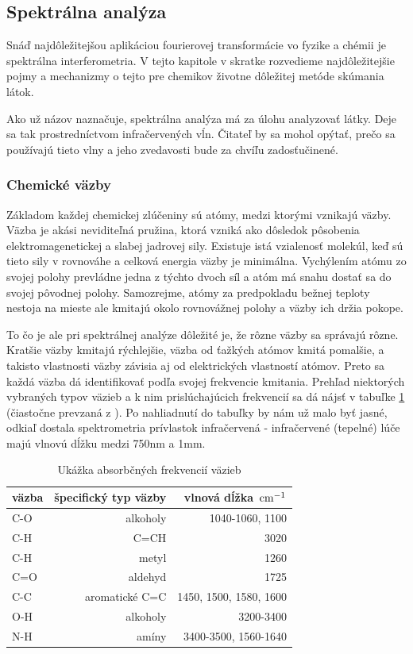 \subsection{Spektrálna analýza}

Snáď najdôležitejšou aplikáciou fourierovej transformácie vo fyzike a
chémii je spektrálna interferometria. V tejto kapitole v skratke
rozvedieme najdôležitejšie pojmy a mechanizmy o tejto pre chemikov
životne dôležitej metóde skúmania látok.


Ako už názov naznačuje, spektrálna analýza má za úlohu analyzovať
látky. Deje sa tak prostredníctvom infračervených vĺn. Čitateľ by sa
mohol opýtať, prečo sa používajú tieto vlny a jeho zvedavosti bude za
chvíľu zadosťučinené.

\subsubsection{Chemické väzby}
Základom každej chemickej zlúčeniny sú atómy, medzi ktorými vznikajú
väzby. Väzba je akási neviditeľná pružina, ktorá vzniká ako dôsledok
pôsobenia elektromagenetickej a slabej jadrovej sily. Existuje istá
vzialenosť molekúl, keď sú tieto sily v rovnováhe a celková energia
väzby je minimálna. Vychýlením atómu zo svojej polohy prevládne jedna
z týchto dvoch síl a atóm má snahu dostať sa do svojej pôvodnej
polohy. Samozrejme, atómy za predpokladu bežnej teploty nestoja na
mieste ale kmitajú okolo rovnovážnej polohy a väzby ich držia pokope.

To čo je ale pri spektrálnej analýze dôležité je, že rôzne väzby sa
správajú rôzne. Kratšie väzby kmitajú rýchlejšie, väzba od ťažkých
atómov kmitá pomalšie, a takisto vlastnosti väzby závisia aj od
elektrických vlastností atómov. Preto sa každá väzba dá identifikovať
podľa svojej frekvencie kmitania. Prehľad niektorých vybraných typov
väzieb a k nim prislúchajúcich frekvencií sa dá nájsť v tabuľke 
\ref{tab:vazby} (čiastočne prevzaná z \cite{wiki:spectro}).
Po nahliadnutí do tabuľky by nám už malo byť jasné, odkiaľ dostala
spektrometria prívlastok infračervená - infračervené (tepelné) lúče
majú vlnovú dĺžku medzi 750nm a 1mm.

\begin{table}[htb]
\centering
\begin{tabular}{| l | r | r |}
\hline
väzba & špecifický typ väzby & vlnová dĺžka $\,\mbox{cm}^{-1}$ \\ \hline
C-O & alkoholy & 1040-1060, 1100 \\ \hline
C-H & C=CH & 3020 \\ \hline
C-H & metyl & 1260 \\ \hline
C=O & aldehyd & 1725 \\ \hline
C-C & aromatické C=C & 1450, 1500, 1580, 1600 \\ \hline
O-H & alkoholy & 3200-3400 \\ \hline
N-H & amíny & 3400-3500, 1560-1640 \\ \hline
\end{tabular}
\caption{Ukážka absorbčných frekvencií väzieb}\label{tab:vazby}
\end{table}

